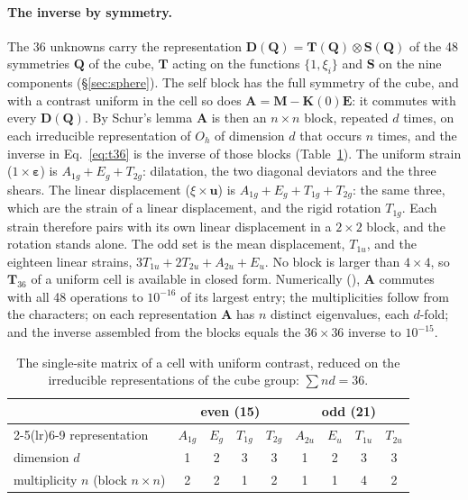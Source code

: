 \documentclass[11pt,a4paper]{article}
\newcommand{\bK}{\mathbf{K}}
\newcommand{\bM}{\mathbf{M}}
\newcommand{\bE}{\mathbf{E}}
\newcommand{\bT}{\mathbf{T}}
\begin{document}
\paragraph{The inverse by symmetry.} The 36 unknowns carry the representation
$\mathbf{D}(\mathbf{Q})=\mathbf{T}(\mathbf{Q})\otimes\mathbf{S}(\mathbf{Q})$ of the 48 symmetries
$\mathbf{Q}$ of the cube, $\mathbf{T}$ acting on the functions $\{1,\xi_i\}$ and $\mathbf{S}$ on the nine
components (\S\ref{sec:sphere}). The self block has the full symmetry of the cube, and with a contrast
uniform in the cell so does $\mathbf{A}=\bM-\bK(0)\bE$: it commutes with every $\mathbf{D}(\mathbf{Q})$.
By Schur's lemma $\mathbf{A}$ is then an $n\times n$ block, repeated $d$ times, on each irreducible
representation of $O_h$ of dimension $d$ that occurs $n$ times, and the inverse in Eq.~\eqref{eq:t36} is
the inverse of those blocks (Table~\ref{tab:irreps}). The uniform strain ($1\times\boldsymbol\varepsilon$)
is $A_{1g}+E_g+T_{2g}$: dilatation, the two diagonal deviators and the three shears. The linear
displacement ($\xi\times\mathbf{u}$) is $A_{1g}+E_g+T_{1g}+T_{2g}$: the same three, which are the strain
of a linear displacement, and the rigid rotation $T_{1g}$. Each strain therefore pairs with its own
linear displacement in a $2\times2$ block, and the rotation stands alone. The odd set is the mean
displacement, $T_{1u}$, and the eighteen linear strains, $3T_{1u}+2T_{2u}+A_{2u}+E_u$. No block is larger
than $4\times4$, so $\bT_{36}$ of a uniform cell is available in closed form. Numerically
(), $\mathbf{A}$ commutes with all 48 operations to
$10^{-16}$ of its largest entry; the multiplicities follow from the characters; on each representation
$\mathbf{A}$ has $n$ distinct eigenvalues, each $d$-fold; and the inverse assembled from the blocks equals
the $36\times36$ inverse to $10^{-15}$.

\begin{table}[ht]
\centering\small
\setlength{\tabcolsep}{7pt}
\begin{tabular}{@{}lcccccccc@{}}
\toprule
 & \multicolumn{4}{c}{even (15)} & \multicolumn{4}{c}{odd (21)} \\
\cmidrule(lr){2-5}\cmidrule(lr){6-9}
representation & $A_{1g}$ & $E_g$ & $T_{1g}$ & $T_{2g}$ & $A_{2u}$ & $E_u$ & $T_{1u}$ & $T_{2u}$ \\
\midrule
dimension $d$ & 1 & 2 & 3 & 3 & 1 & 2 & 3 & 3 \\
multiplicity $n$ (block $n\times n$) & 2 & 2 & 1 & 2 & 1 & 1 & 4 & 2 \\
\bottomrule
\end{tabular}
\caption{The single-site matrix of a cell with uniform contrast, reduced on the irreducible
representations of the cube group: $\sum nd=36$.}\label{tab:irreps}
\end{table}
\end{document}
